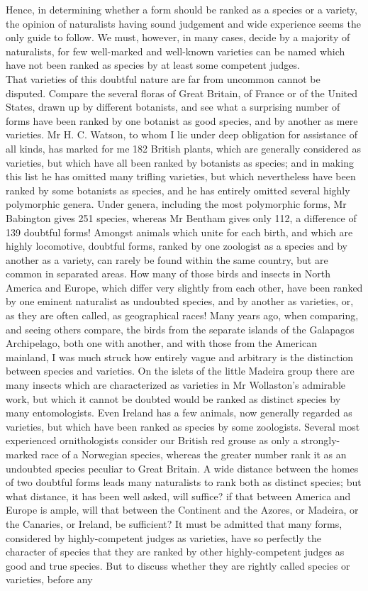 \indent Hence, in determining whether a form should be ranked as a species or a variety, the opinion of naturalists having sound judgement and wide experience seems the only guide to follow. We must, however, in many cases, decide by a majority of naturalists, for few well-marked and well-known varieties can be named which have not been ranked as species by at least some competent judges. \\
\indent That varieties of this doubtful nature are far from uncommon cannot be disputed. Compare the several floras of Great Britain, of France or of the United States, drawn up by different botanists, and see what a surprising number of forms have been ranked by one botanist as good species, and by another as mere varieties. Mr H. C. Watson, to whom I lie under deep obligation for assistance of all kinds, has marked for me 182 British plants, which are generally considered as varieties, but which have all been ranked by botanists as species; and in making this list he has omitted many trifling varieties, but which nevertheless have been ranked by some botanists as species, and he has entirely omitted several highly polymorphic genera. Under genera, including the most polymorphic forms, Mr Babington gives 251 species, whereas Mr Bentham gives only 112, a difference of 139 doubtful forms! Amongst animals which unite for each birth, and which are highly locomotive, doubtful forms, ranked by one zoologist as a species and by another as a variety, can rarely be found within the same country, but are common in separated areas. How many of those birds and insects in North America and Europe, which differ very slightly from each other, have been ranked by one eminent naturalist as undoubted species, and by another as varieties, or, as they are often called, as geographical races! Many years ago, when comparing, and seeing others compare, the birds from the separate islands of the Galapagos Archipelago, both one with another, and with those from the American mainland, I was much struck how entirely vague and arbitrary is the distinction between species and varieties. On the islets of the little Madeira group there are many insects which are characterized as varieties in Mr Wollaston's admirable work, but which it cannot be doubted would be ranked as distinct species by many entomologists. Even Ireland has a few animals, now generally regarded as varieties, but which have been ranked as species by some zoologists. Several most experienced ornithologists consider our British red grouse as only a strongly-marked race of a Norwegian species, whereas the greater number rank it as an undoubted species peculiar to Great Britain. A wide distance between the homes of two doubtful forms leads many naturalists to rank both as distinct species; but what distance, it has been well asked, will suffice?  if that between America and Europe is ample, will that between the Continent and the Azores, or Madeira, or the Canaries, or Ireland, be sufficient?  It must be admitted that many forms, considered by highly-competent judges as varieties, have so perfectly the character of species that they are ranked by other highly-competent judges as good and true species. But to discuss whether they are rightly called species or varieties, before any 